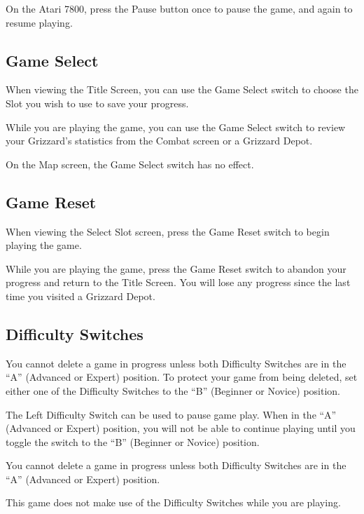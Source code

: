 \documentclass[12pt,openright,book]{memoir}
\begin{document}
On the Atari  7800, press the Pause  button once to pause  the game, and
again to resume playing.

\fi

\subsection{Game Select}

When viewing  the Title Screen,  you can use  the Game Select  switch to
choose the Slot you wish to use to save your progress.

While you are  playing the game, you  can use the Game  Select switch to
review   your  Grizzard's   statistics   from  the   Combat  screen   or
a Grizzard Depot.

On the Map screen, the Game Select switch has no effect.

\subsection{Game Reset}

When viewing  the Select  Slot screen,  press the  Game Reset  switch to
begin playing the game.

While you are  playing the game, press the Game  Reset switch to abandon
your progress and return to the Title Screen. You will lose any progress
since the last time you visited a Grizzard Depot.

\subsection{Difficulty Switches}

You cannot delete a game in progress unless both Difficulty Switches are
in the  ``A'' (Advanced or Expert)  position. To protect your  game from
being deleted,  set either one of  the Difficulty Switches to  the ``B''
(Beginner or Novice) position.

\ifdefined\TVSECAM

The Left Difficulty Switch  can be used to pause game  play. When in the
``A'' (Advanced  or Expert) position, you  will not be able  to continue
playing  until  you  toggle  the   switch  to  the  ``B''  (Beginner  or
Novice) position.

You cannot delete a game in progress unless both Difficulty Switches are
in the ``A'' (Advanced or Expert) position.

\else

This  game does  not  make  use of  the  Difficulty  Switches while  you
are playing. 
\end{document}
